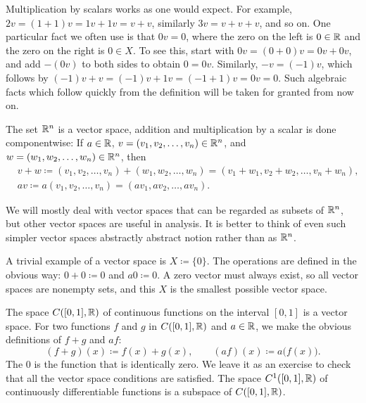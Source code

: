 Multiplication by scalars works as one would expect.
For example, $2v = (1+1)v = 1v + 1v = v+v$, similarly $3v = v+v+v$, and
so on.  
One particular fact we often use is that $0 v = 0$, where
the zero on the left is $0 \in {\mathbb{R}}$ and the zero on the right is $0 \in X$.
To see this, start with
$0v = (0+0)v = 0v + 0v$, and add $-(0v)$ to both sides
to obtain $0 = 0v$.  Similarly, $-v = (-1)v$, which follows by
$(-1)v+v = (-1)v + 1v = (-1+1)v = 0v = 0$.
Such algebraic facts which follow quickly from the definition will be taken
for granted from now on.

\begin{example}
The set ${\mathbb{R}}^n$ is a vector space, addition
and multiplication by a scalar is done componentwise:
If $a \in {\mathbb{R}}$, $v = (v_1,v_2,\ldots,v_n) \in {\mathbb{R}}^n$, and $w =
(w_1,w_2,\ldots,w_n) \in {\mathbb{R}}^n$, then
\begin{align*}
& v+w \coloneqq
(v_1,v_2,\ldots,v_n) +
(w_1,w_2,\ldots,w_n) 
=
(v_1+w_1,v_2+w_2,\ldots,v_n+w_n) , \\
& a v \coloneqq
a (v_1,v_2,\ldots,v_n) =
(a v_1, a v_2,\ldots, a v_n) .
\end{align*}
\end{example}

We will mostly deal with  vector spaces that can
be regarded as subsets of ${\mathbb{R}}^n$, but other vector spaces are useful in
analysis.
It is better to think of even such simpler
vector spaces abstractly abstract notion rather than as ${\mathbb{R}}^n$.

\begin{example}
A trivial example of a vector space is
$X \coloneqq \{ 0 \}$.  The operations are defined in the obvious way:
$0 + 0 \coloneqq 0$ and $a0 \coloneqq 0$.  A zero vector must always exist,
so all vector spaces are nonempty sets, and this $X$ is the smallest
possible vector space.
\end{example}

\begin{example}
The space $C([0,1],{\mathbb{R}})$ of continuous functions on the interval $[0,1]$
is a vector space.  For two functions $f$ and $g$ in $C([0,1],{\mathbb{R}})$ and
$a \in {\mathbb{R}}$, we make the obvious definitions of $f+g$ and $af$:
\begin{equation*}
(f+g)(x) \coloneqq f(x) + g(x), \qquad (af) (x) \coloneqq a\bigl(f(x)\bigr) .
\end{equation*}
The 0 is the function that is identically zero.  We leave it as an exercise
to check that all the vector space conditions are satisfied.
The space $C^1([0,1],{\mathbb{R}})$ of continuously differentiable functions is
a subspace of $C([0,1],{\mathbb{R}})$.
\end{example}

